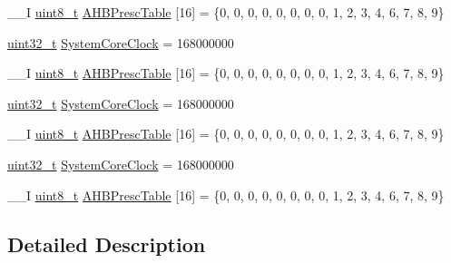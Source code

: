 \begin{DoxyCompactItemize}
\item 
\-\_\-\-\_\-\-I \hyperlink{stdint_8h_aba7bc1797add20fe3efdf37ced1182c5}{uint8\-\_\-t} \hyperlink{group___s_t_m32_f4xx___system___private___variables_gacdc3ef54c0704c90e69a8a84fb2d970d}{A\-H\-B\-Presc\-Table} \mbox{[}16\mbox{]} = \{0, 0, 0, 0, 0, 0, 0, 0, 1, 2, 3, 4, 6, 7, 8, 9\}
\item 
\hyperlink{stdint_8h_a435d1572bf3f880d55459d9805097f62}{uint32\-\_\-t} \hyperlink{group___s_t_m32_f4xx___system___private___variables_gaa3cd3e43291e81e795d642b79b6088e6}{System\-Core\-Clock} = 168000000
\item 
\-\_\-\-\_\-\-I \hyperlink{stdint_8h_aba7bc1797add20fe3efdf37ced1182c5}{uint8\-\_\-t} \hyperlink{group___s_t_m32_f4xx___system___private___variables_gacdc3ef54c0704c90e69a8a84fb2d970d}{A\-H\-B\-Presc\-Table} \mbox{[}16\mbox{]} = \{0, 0, 0, 0, 0, 0, 0, 0, 1, 2, 3, 4, 6, 7, 8, 9\}
\item 
\hyperlink{stdint_8h_a435d1572bf3f880d55459d9805097f62}{uint32\-\_\-t} \hyperlink{group___s_t_m32_f4xx___system___private___variables_gaa3cd3e43291e81e795d642b79b6088e6}{System\-Core\-Clock} = 168000000
\item 
\-\_\-\-\_\-\-I \hyperlink{stdint_8h_aba7bc1797add20fe3efdf37ced1182c5}{uint8\-\_\-t} \hyperlink{group___s_t_m32_f4xx___system___private___variables_gacdc3ef54c0704c90e69a8a84fb2d970d}{A\-H\-B\-Presc\-Table} \mbox{[}16\mbox{]} = \{0, 0, 0, 0, 0, 0, 0, 0, 1, 2, 3, 4, 6, 7, 8, 9\}
\item 
\hyperlink{stdint_8h_a435d1572bf3f880d55459d9805097f62}{uint32\-\_\-t} \hyperlink{group___s_t_m32_f4xx___system___private___variables_gaa3cd3e43291e81e795d642b79b6088e6}{System\-Core\-Clock} = 168000000
\item 
\-\_\-\-\_\-\-I \hyperlink{stdint_8h_aba7bc1797add20fe3efdf37ced1182c5}{uint8\-\_\-t} \hyperlink{group___s_t_m32_f4xx___system___private___variables_gacdc3ef54c0704c90e69a8a84fb2d970d}{A\-H\-B\-Presc\-Table} \mbox{[}16\mbox{]} = \{0, 0, 0, 0, 0, 0, 0, 0, 1, 2, 3, 4, 6, 7, 8, 9\}
\end{DoxyCompactItemize}


\subsection{Detailed Description}


